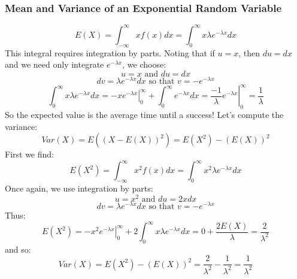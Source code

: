 \documentclass[12pt]{article} %
\begin{document}
\subsubsection{Mean and Variance of an Exponential Random Variable}
$$E(X) = \int_{-\infty}^{\infty}x f(x) dx = \int_0^\infty x \lambda e^{-\lambda x} dx$$
This integral requires integration by parts. Noting that if $u = x$, then $du=dx$ and we need only integrate $e^{-\lambda x}$, we choose:
$$u = x \textrm{ and } du = dx$$
$$dv = \lambda e^{-\lambda x} dx \textrm{ so that } v = -e^{-\lambda x}$$
$$\int_0^\infty x \lambda e^{-\lambda x} dx = \left.-xe^{-\lambda x}\right\rvert_0^\infty + \int_0^\infty e^{-\lambda x} dx = \left.\frac{-1}{\lambda} e^{-\lambda x} \right\rvert_0^\infty = \frac1\lambda$$
So the expected value is the average time until a success! Let's compute the variance:
$$Var(X) = E\left((X-E(X))^2\right) = E(X^2) - \left(E(X)\right)^2$$
First we find:
$$E(X^2) =  \int_{-\infty}^{\infty}x^2 f(x) dx = \int_0^\infty x^2 \lambda e^{-\lambda x} dx$$
Once again, we use integration by parts:
$$u = x^2 \textrm{ and } du = 2x dx$$
$$dv = \lambda e^{-\lambda x} dx \textrm{ so that } v = -e^{-\lambda x }$$
Thus: 
$$E(X^2) = \left.-x^2e^{-\lambda x}\right\rvert_0^\infty + 2 \int_0^\infty x \lambda e^{-\lambda x} dx = 0 + \frac{2E(X)}{\lambda} = \frac2{\lambda^2}$$
and so:
$$Var(X) = E(X^2)  -  \left(E(X)\right)^2 = \frac2{\lambda^2} - \frac1{\lambda^2} = \frac1{\lambda^2}$$
\end{document}
